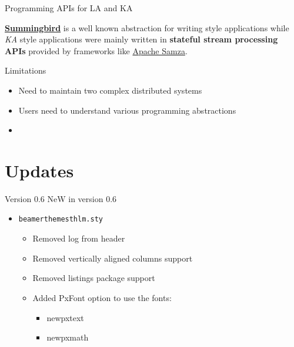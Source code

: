 \documentclass[newPxFont]{beamer}
\begin{document}
\begin{frame}{Programming APIs for LA and KA}

\href{https://github.com/twitter/summingbird}{\textbf{Summingbird}} is a well known abstraction for writing  style applications while \textit{KA} style applications were mainly written in \textbf{stateful stream processing APIs} provided by frameworks like \href{http://samza.apache.org}{Apache Samza}.

\begin{block}{Limitations}
\begin{itemize}
	\item Need to maintain two complex distributed systems
	\item Users need to understand various programming abstractions 
	\item
\end{itemize}
\end{block}

\end{frame}

%
%

\section{Updates}


\begin{frame}[c]{Version 0.6}
\alert{NeW} in version 0.6

\begin{itemize}
	\item \texttt{beamerthemesthlm.sty}
	\begin{itemize}
		\item Removed log from header
		\item Removed vertically aligned columns support
		\item Removed listings package support
		\item Added PxFont option to use the fonts:
		\begin{itemize}
			\item newpxtext
			\item newpxmath
		\end{itemize}
	\end{itemize}
\end{itemize}
\end{frame}
\end{document}
